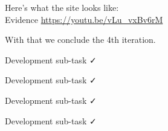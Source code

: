 Here's what the site looks like: \\ \vspace{0.2cm}
{\sffamily Evidence}  \url{https://youtu.be/vLu_vxBv6rM} \\ \vspace{0.2cm}

With that we conclude the 4th iteration. \\ \vspace{0.2cm}

{\sffamily Development sub-task } \faCheck \\ \vspace{0.2cm}

{\sffamily Development sub-task } \faCheck \\ \vspace{0.2cm}

{\sffamily Development sub-task } \faCheck \\ \vspace{0.2cm}

{\sffamily Development sub-task } \faCheck \\ \vspace{0.2cm}

